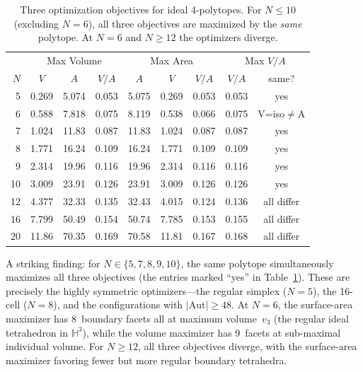 \documentclass[11pt]{article}
\begin{document}
\begin{table}[t]
\centering
\caption{Three optimization objectives for ideal 4-polytopes.
For $N \le 10$ (excluding $N = 6$), all three objectives are
maximized by the \emph{same} polytope.  At $N = 6$ and
$N \ge 12$ the optimizers diverge.}
\label{tab:surface}
\smallskip
\begin{tabular}{@{}r|ccc|ccc|cc@{}}
\toprule
& \multicolumn{3}{c|}{Max Volume} & \multicolumn{3}{c|}{Max Area} & \multicolumn{2}{c}{Max $V/A$} \\
$N$ & $V$ & $A$ & $V/A$ & $A$ & $V$ & $V/A$ & $V/A$ & same? \\
\midrule
5   & 0.269 & 5.074 & 0.053 & 5.075 & 0.269 & 0.053 & 0.053 & yes \\
6   & 0.588 & 7.818 & 0.075 & 8.119 & 0.538 & 0.066 & 0.075 & V=iso$\ne$A \\
7   & 1.024 & 11.83 & 0.087 & 11.83 & 1.024 & 0.087 & 0.087 & yes \\
8   & 1.771 & 16.24 & 0.109 & 16.24 & 1.771 & 0.109 & 0.109 & yes \\
9   & 2.314 & 19.96 & 0.116 & 19.96 & 2.314 & 0.116 & 0.116 & yes \\
10  & 3.009 & 23.91 & 0.126 & 23.91 & 3.009 & 0.126 & 0.126 & yes \\
12  & 4.377 & 32.33 & 0.135 & 32.43 & 4.015 & 0.124 & 0.136 & all differ \\
16  & 7.799 & 50.49 & 0.154 & 50.74 & 7.785 & 0.153 & 0.155 & all differ \\
20  & 11.86 & 70.35 & 0.169 & 70.58 & 11.81 & 0.167 & 0.168 & all differ \\
\bottomrule
\end{tabular}
\end{table}

A striking finding: for $N \in \{5, 7, 8, 9, 10\}$, the same
polytope simultaneously maximizes all three objectives (the
entries marked ``yes'' in Table~\ref{tab:surface}).  These are
precisely the highly symmetric optimizers---the regular simplex
($N = 5$), the 16-cell ($N = 8$), and the configurations with
$|\mathrm{Aut}| \ge 48$.  At $N = 6$, the surface-area maximizer
has 8~boundary facets all at maximum volume~$v_3$ (the regular
ideal tetrahedron in $\mathbb{H}^3$), while the volume maximizer
has 9~facets at sub-maximal individual volume.  For $N \ge 12$,
all three objectives diverge, with the surface-area maximizer
favoring fewer but more regular boundary tetrahedra.
\end{document}

